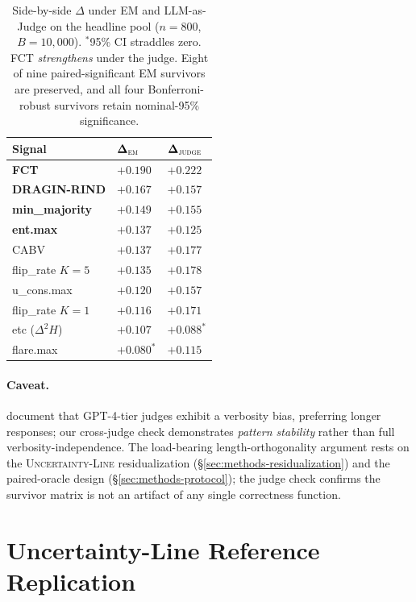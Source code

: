 \documentclass[11pt]{article}
\begin{document}
\begin{table}[h]
\centering\small
\begin{tabular}{@{}lll@{}}
\toprule
\textbf{Signal} & $\boldsymbol{\Delta}_{\textsc{em}}$ & $\boldsymbol{\Delta}_{\textsc{judge}}$ \\
\midrule
\textbf{FCT}              & $+0.190$         & $\mathbf{+0.222}$ \\
\textbf{DRAGIN-RIND}      & $+0.167$         & $+0.157$ \\
\textbf{min\_majority}    & $+0.149$         & $+0.155$ \\
\textbf{ent.max}          & $+0.137$         & $+0.125$ \\
CABV                      & $+0.137$         & $+0.177$ \\
flip\_rate $K{=}5$        & $+0.135$         & $+0.178$ \\
u\_cons.max               & $+0.120$         & $+0.157$ \\
flip\_rate $K{=}1$        & $+0.116$         & $+0.171$ \\
etc ($\Delta^2 H$)        & $+0.107$         & $+0.088^{\ast}$ \\
flare.max                 & $+0.080^{\ast}$  & $+0.115$ \\
\bottomrule
\end{tabular}
\caption{Side-by-side $\Delta$ under EM and LLM-as-Judge on the headline pool ($n{=}800$, $B{=}10{,}000$). $^{\ast}$95\% CI straddles zero. FCT \emph{strengthens} under the judge. Eight of nine paired-significant EM survivors are preserved, and all four Bonferroni-robust survivors retain nominal-95\% significance.}
\label{tab:llmjudge}
\end{table}

\paragraph{Caveat.} \citet{zheng_judging_2024} document that GPT-4-tier judges exhibit a verbosity bias, preferring longer responses; our cross-judge check demonstrates \emph{pattern stability} rather than full verbosity-independence. The load-bearing length-orthogonality argument rests on the \textsc{Uncertainty-Line} residualization (\S\ref{sec:methods-residualization}) and the paired-oracle design (\S\ref{sec:methods-protocol}); the judge check confirms the survivor matrix is not an artifact of any single correctness function.

\section{Uncertainty-Line Reference Replication}
\label{sec:appendix-uline}
\end{document}
